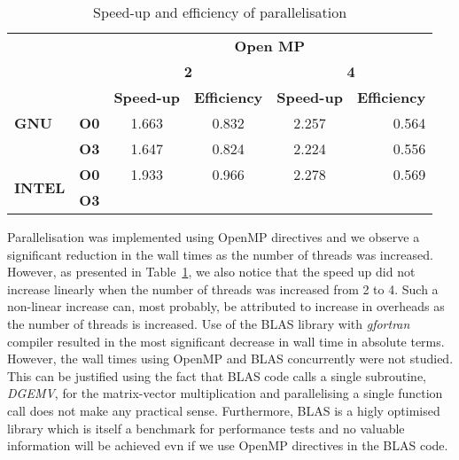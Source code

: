 \documentclass[11pt, oneside]{article}   	%
\begin{document}
\begin{table}[htp]
\caption{Speed-up and efficiency of parallelisation}
\label{tab:su}
\centering
\begin{tabular}{@{}lccccr@{}}
\toprule
                                & \multicolumn{1}{l}{} & \multicolumn{4}{c}{\textbf{Open MP}}                                                                  \\ \cmidrule(l){3-6} 
                                & \multicolumn{1}{l}{} & \multicolumn{2}{c}{\textbf{2}}          & \multicolumn{2}{c}{\textbf{4}}                              \\ \cmidrule(l){3-6} 
                                & \multicolumn{1}{l}{} & \textbf{Speed-up} & \textbf{Efficiency} & \textbf{Speed-up} & \multicolumn{1}{c}{\textbf{Efficiency}} \\ \midrule
\textbf{GNU}                    & \textbf{O0}          & 1.663             & 0.832               & 2.257             & 0.564                                   \\
                                & \textbf{O3}          & 1.647             & 0.824               & 2.224             & 0.556                                   \\
\multirow{2}{*}{\textbf{INTEL}} & \textbf{O0}          & 1.933             & 0.966               & 2.278             & 0.569                                   \\
                                & \textbf{O3}          & {}                & {}                  & {}                & {}                                   \\ \bottomrule
\end{tabular}
\end{table}

Parallelisation was implemented using OpenMP directives and we observe a significant reduction in the wall times as the number of threads was increased. However, as presented in Table~\ref{tab:su}, we also notice that the speed up did not increase linearly when the number of threads was increased from 2 to 4. Such a non-linear increase can, most probably, be attributed to increase in overheads as the number of threads is increased. Use of the BLAS library with \textit{gfortran} compiler resulted in the most significant decrease in wall time in absolute terms. However, the wall times using OpenMP and BLAS concurrently were not studied. This can be justified using the fact that BLAS code calls a single subroutine, \textit{DGEMV}, for the matrix-vector multiplication and parallelising a single function call does not make any practical sense. Furthermore, BLAS is a higly optimised library which is itself a benchmark for performance tests and no valuable information will be achieved evn if we use OpenMP directives in the BLAS code.
\end{document}
